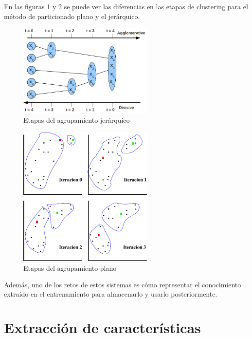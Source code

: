 En las figuras \ref{fig:hier-clustering} y \ref{fig:k-medias} se puede ver las diferencias en las etapas de clustering para el método de particionado plano y el jerárquico.

\begin{figure}[htbp]
\centering
\includegraphics[width=0.6\textwidth]{hierarchical-clustering}
\caption[Etapas del agrupamiento jerárquico]{Etapas del agrupamiento jerárquico \citep{Rai2011}}
\label{fig:hier-clustering}
\end{figure}

\begin{figure}[htbp]
\centering
\includegraphics[width=0.6\textwidth]{k-medias}
\caption[Etapas del agrupamiento plano]{Etapas del agrupamiento plano \citep{RuizReina2013}}
\label{fig:k-medias}
\end{figure}

Además, uno de los retos de estos sistemas es cómo representar el conocimiento extraído en el entrenamiento para almacenarlo y usarlo posteriormente.

\section{Extracción de características}

